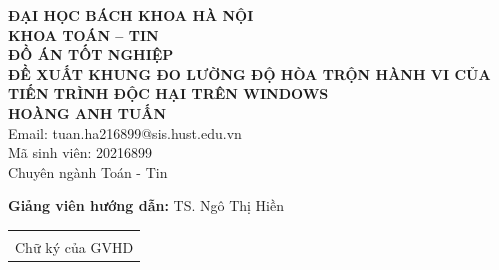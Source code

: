 ﻿\documentclass[DoAn.tex]{subfiles}
\begin{document}
\begin{titlepage}
\thispagestyle{empty}

\begin{center}
{\textbf{\large ĐẠI HỌC BÁCH KHOA HÀ NỘI}}\\[0.2cm]
{\textbf{\large KHOA TOÁN -- TIN}}\\[5cm]

{\textbf{\Large ĐỒ ÁN TỐT NGHIỆP}}\\[1.5cm]
{\textbf{\Large ĐỀ XUẤT KHUNG ĐO LƯỜNG ĐỘ HÒA TRỘN HÀNH VI CỦA TIẾN TRÌNH ĐỘC HẠI TRÊN WINDOWS}}\\[2.5cm]

{\textbf{\large HOÀNG ANH TUẤN}}\\[0.2cm]
Email: tuan.ha216899@sis.hust.edu.vn\\[0.1cm]
Mã sinh viên: 20216899\\[0.1cm]
Chuyên ngành Toán - Tin\\[3.5cm]
\end{center}

\noindent
\textbf{Giảng viên hướng dẫn:} \hspace{0.5cm} TS. Ngô Thị Hiền \hfill \begin{tabular}{c} \underline{\hspace{4cm}} \\ \small Chữ ký của GVHD \end{tabular}

\end{titlepage}
\end{document}
